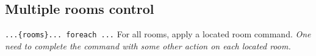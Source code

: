 \documentclass[10pt,a4paper]{scrartcl}
\newenvironment{apiCode}[1]
{ \begin{lrbox}{\mybox} \begin{minipage}{0.9\textwidth} {\color{Mahogany} \small\texttt{#1}} \vspace{8pt} \newline }
{ \end{minipage} \end{lrbox}\fbox{\usebox{\mybox}} \newline\vspace{4pt}\newline }
\begin{document}
\subsection{Multiple rooms control}
\begin{apiCode}{...\{rooms\}... foreach ...}
For all rooms, apply a located room command.\newline
\textit{One need to complete the command with some other action on each located room.}
\end{apiCode}
\end{document}

